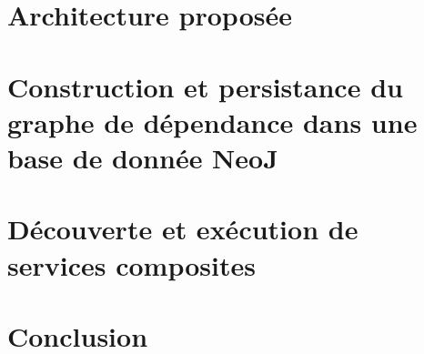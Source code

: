 \section{Architecture proposée}
\label{sec:proposition}

\section{Construction et persistance du graphe de dépendance dans une
  base de donnée NeoJ}
\section{Découverte et exécution de services composites}

\section*{Conclusion}
\label{sec:conclusion}
 



